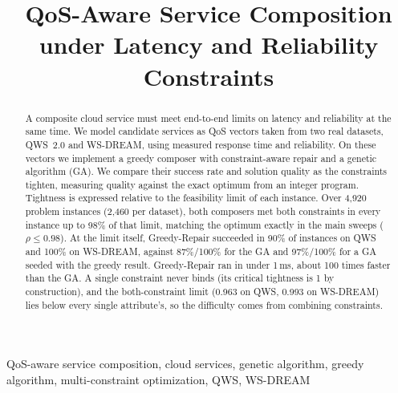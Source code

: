 \documentclass[conference]{IEEEtran}
\begin{document}
\title{QoS-Aware Service Composition under Latency and Reliability Constraints}

\author{
\and
{}
}

\maketitle

\begin{abstract}
A composite cloud service must meet end-to-end limits on latency and reliability at the same time. We model candidate services as QoS vectors taken from two real datasets, QWS~2.0 and WS-DREAM, using measured response time and reliability. On these vectors we implement a greedy composer with constraint-aware repair and a genetic algorithm (GA). We compare their success rate and solution quality as the constraints tighten, measuring quality against the exact optimum from an integer program. Tightness is expressed relative to the feasibility limit of each instance. Over 4,920 problem instances (2,460 per dataset), both composers met both constraints in every instance up to 98\% of that limit, matching the optimum exactly in the main sweeps ($\rho\le0.98$). At the limit itself, Greedy-Repair succeeded in 90\% of instances on QWS and 100\% on WS-DREAM, against 87\%/100\% for the GA and 97\%/100\% for a GA seeded with the greedy result. Greedy-Repair ran in under 1\,ms, about 100 times faster than the GA. A single constraint never binds (its critical tightness is 1 by construction), and the both-constraint limit (0.963 on QWS, 0.993 on WS-DREAM) lies below every single attribute's, so the difficulty comes from combining constraints.
\end{abstract}

\begin{IEEEkeywords}
QoS-aware service composition, cloud services, genetic algorithm, greedy algorithm, multi-constraint optimization, QWS, WS-DREAM
\end{IEEEkeywords}
\end{document}
